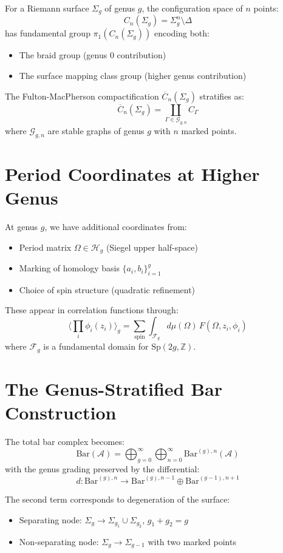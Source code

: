 For a Riemann surface $\Sigma_g$ of genus $g$, the configuration space of $n$ points:
$$C_n(\Sigma_g) = \Sigma_g^n \setminus \Delta$$
has fundamental group $\pi_1(C_n(\Sigma_g))$ encoding both:
\begin{itemize}
\item The braid group (genus 0 contribution)
\item The surface mapping class group (higher genus contribution)
\end{itemize}

The Fulton-MacPherson compactification $\overline{C}_n(\Sigma_g)$ stratifies as:
$$\overline{C}_n(\Sigma_g) = \coprod_{\Gamma \in \mathcal{G}_{g,n}} C_{\Gamma}$$
where $\mathcal{G}_{g,n}$ are stable graphs of genus $g$ with $n$ marked points.

\section{Period Coordinates at Higher Genus}

At genus $g$, we have additional coordinates from:
\begin{itemize}
\item Period matrix $\Omega \in \mathcal{H}_g$ (Siegel upper half-space)
\item Marking of homology basis $\{a_i, b_i\}_{i=1}^g$
\item Choice of spin structure (quadratic refinement)
\end{itemize}

These appear in correlation functions through:
$$\langle \prod_i \phi_i(z_i) \rangle_g = \sum_{\text{spin}} \int_{\mathcal{F}_g} d\mu(\Omega) \, F(\Omega, z_i, \phi_i)$$
where $\mathcal{F}_g$ is a fundamental domain for $\text{Sp}(2g, \mathbb{Z})$.

\section{The Genus-Stratified Bar Construction}

The total bar complex becomes:
$$\text{Bar}(\mathcal{A}) = \bigoplus_{g=0}^{\infty} \bigoplus_{n=0}^{\infty} \text{Bar}^{(g),n}(\mathcal{A})$$
with the genus grading preserved by the differential:
$$d: \text{Bar}^{(g),n} \to \text{Bar}^{(g),n-1} \oplus \text{Bar}^{(g-1),n+1}$$

The second term corresponds to degeneration of the surface:
\begin{itemize}
\item Separating node: $\Sigma_g \to \Sigma_{g_1} \cup \Sigma_{g_2}$, $g_1 + g_2 = g$
\item Non-separating node: $\Sigma_g \to \Sigma_{g-1}$ with two marked points
\end{itemize}

